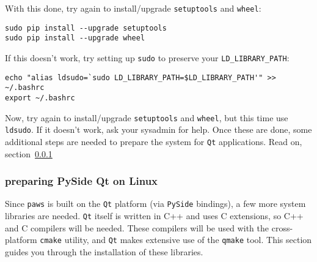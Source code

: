 With this done, try again to install/upgrade \verb|setuptools| and \verb|wheel|:
\begin{lstlisting}
sudo pip install --upgrade setuptools 
sudo pip install --upgrade wheel 
\end{lstlisting}
If this doesn't work, try setting up \verb|sudo| to preserve your \verb|LD_LIBRARY_PATH|:
\begin{lstlisting}
echo "alias ldsudo=`sudo LD_LIBRARY_PATH=$LD_LIBRARY_PATH'" >> ~/.bashrc
export ~/.bashrc
\end{lstlisting}

Now, try again to install/upgrade \verb|setuptools| and \verb|wheel|,
but this time use \verb|ldsudo|.
If it doesn't work, ask your sysadmin for help.
Once these are done, some additional steps are needed
to prepare the system for \verb|Qt| applications.
Read on, section~\ref{subsubsec:pyside_linux}


\subsubsection{preparing PySide Qt on Linux}
\label{subsubsec:pyside_linux}

Since \verb|paws| is built on the \verb|Qt| platform 
(via \verb|PySide| bindings),
a few more system libraries are needed.
\verb|Qt| itself is written in C++
and uses C extensions,
so C++ and C compilers will be needed.
These compilers will be used with the 
cross-platform \verb|cmake| utility,
and \verb|Qt| makes extensive use of the \verb|qmake| tool.
This section guides you through the installation of these libraries.

